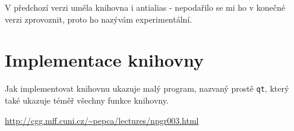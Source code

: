 \documentclass[11pt]{article} %
\begin{document}
V předchozí verzi uměla knihovna i antialias - nepodařilo se mi ho v konečné verzi zprovoznit, proto ho nazývám experimentální.

\section{Implementace knihovny}

Jak implementovat knihovnu ukazuje malý program, nazvaný prostě \texttt{qt}, který také ukazuje téměř všechny funkce knihovny.



\begin{thebibliography}{9}

     \url{http://cgg.mff.cuni.cz/~pepca/lectures/npgr003.html}
     
 \end{thebibliography}
\end{document}
